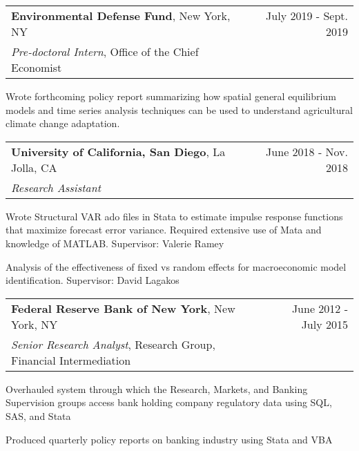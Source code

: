 \documentclass[10pt]{article}
\newcommand{\mysep}{\vspace{4pt}}
\begin{document}
\begin{blist}


\end{blist}

\mysep{}
\begin{tabularx}{\textwidth}{LR}
\textbf{Environmental Defense Fund}, New York, NY 
&
July 2019 - Sept. 2019
\\
\emph{Pre-doctoral Intern}, Office of the Chief Economist
\end{tabularx}
\begin{blist}
\item Wrote forthcoming policy report summarizing how spatial general equilibrium models and time series analysis techniques can be used to understand agricultural climate change adaptation.
\end{blist}

\mysep{}
\begin{tabularx}{\textwidth}{LR}
\textbf{University of California, San Diego}, La Jolla, CA 
& June 2018 - Nov. 2018
\\
\emph{Research Assistant}
\end{tabularx}
\begin{blist}
\item Wrote Structural VAR ado files in Stata to estimate impulse response functions that maximize forecast error variance. Required extensive use of Mata and knowledge of MATLAB. Supervisor: Valerie Ramey
\item Analysis of the effectiveness of fixed vs random effects for macroeconomic model identification. Supervisor: David Lagakos
\end{blist}

\mysep{}
\begin{tabularx}{\textwidth}{LR}
\textbf{Federal Reserve Bank of New York}, New York, NY
& June 2012 - July 2015 
\\
\emph{Senior Research Analyst}, Research Group, Financial Intermediation
\end{tabularx}
\begin{blist}
\item Overhauled system through which the Research, Markets, and Banking Supervision groups access bank holding company regulatory data using SQL, SAS, and Stata
\item Produced quarterly policy reports on banking industry using Stata and VBA
\end{blist}
\end{document}
